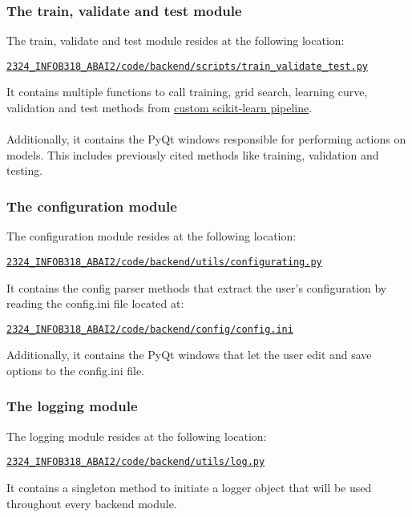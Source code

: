 \subsubsection{The train, validate and test module}
The train, validate and test module resides at the following location: 
\begin{codebox}
    \large\href{https://github.com/UNamurCSFaculty/2324_INFOB318_ABAI2/blob/main/code/backend/scripts/train_validate_test.py}{\texttt{2324\_INFOB318\_ABAI2/code/backend/scripts/train\_validate\_test.py}}
\end{codebox}
It contains multiple functions to call training, grid search, learning curve, validation and test methods from \hyperref[subsubsec:pipelines]{custom scikit-learn pipeline}.\\\\Additionally, it contains the PyQt windows responsible for performing actions on models. This includes previously cited methods like training, validation and testing.

\subsubsection{The configuration module}
The configuration module resides at the following location: 
\begin{codebox}
    \large\href{https://github.com/UNamurCSFaculty/2324_INFOB318_ABAI2/blob/main/code/backend/utils/configurating.py}{\texttt{2324\_INFOB318\_ABAI2/code/backend/utils/configurating.py}}
\end{codebox}
It contains the config parser methods that extract the user's configuration by reading the config.ini file located at:
\begin{codebox}
    \large\href{https://github.com/UNamurCSFaculty/2324_INFOB318_ABAI2/blob/main/code/backend/config/config.ini}{\texttt{2324\_INFOB318\_ABAI2/code/backend/config/config.ini}}
\end{codebox}
Additionally, it contains the PyQt windows that let the user edit and save options to the config.ini file. 

\clearpage
\subsubsection{The logging module}
The logging module resides at the following location: 
\begin{codebox}
    \large\href{https://github.com/UNamurCSFaculty/2324_INFOB318_ABAI2/blob/main/code/backend/utils/log.py}{\texttt{2324\_INFOB318\_ABAI2/code/backend/utils/log.py}}
\end{codebox}
It contains a singleton method to initiate a logger object that will be used throughout every backend module. 


